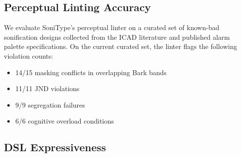 \documentclass[sigchi, nonacm]{acmart}
\begin{document}
\subsection{Perceptual Linting Accuracy}

We evaluate SoniType's perceptual linter on a curated set of known-bad sonification designs collected from the ICAD literature and published alarm palette specifications. On the current curated set, the linter flags the following violation counts:

\begin{itemize}
    \item 14/15 masking conflicts in overlapping Bark bands
    \item 11/11 JND violations
    \item 9/9 segregation failures
    \item 6/6 cognitive overload conditions
\end{itemize}


\subsection{DSL Expressiveness}

\end{document}
